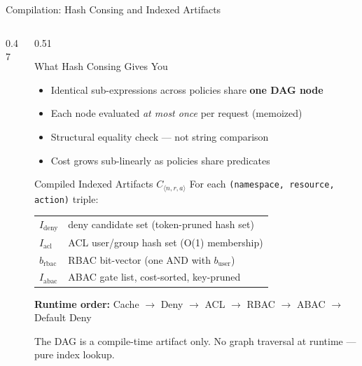 \documentclass[aspectratio=169,10pt]{beamer}
\newcommand{\tightitems}{%
  \setlength{\topsep}{1pt}%
  \setlength{\itemsep}{2pt}%
  \setlength{\parsep}{0pt}%
  \setlength{\parskip}{0pt}%
}
\newcommand{\highlightbanner}[1]{%
  \begin{center}
  \begin{tcolorbox}[colback=uhapGray,colframe=uhapGray,
                    boxrule=0pt,arc=1mm,
                    left=6pt,right=6pt,top=1pt,bottom=1pt,
                    width=0.97\linewidth,
                    borderline west={2pt}{0pt}{uhapTeal}]
  \tiny\color{uhapNavyD}#1
  \end{tcolorbox}
  \end{center}}
\begin{document}
\begin{frame}[t]{Compilation: Hash Consing and Indexed Artifacts}
\begin{columns}[T,onlytextwidth]
\begin{column}{0.47\textwidth}
{%
}
\end{column}
\begin{column}{0.51\textwidth}
\begin{callout}{What Hash Consing Gives You}
\begin{itemize}\tightitems
\item Identical sub-expressions across policies share \textbf{one DAG node}
\item Each node evaluated \emph{at most once} per request (memoized)
\item Structural equality check --- not string comparison
\item Cost grows sub-linearly as policies share predicates
\end{itemize}
\end{callout}
\vspace{0pt}
\begin{callout}{Compiled Indexed Artifacts $C_{\langle n,r,a\rangle}$}
{\tiny For each \texttt{(namespace, resource, action)} triple:}\vspace{1pt}

\setlength{\tabcolsep}{3pt}
\renewcommand{\arraystretch}{1.0}
\begin{tabular}{@{}l p{4.2cm}@{}}
$I_{\mathrm{deny}}$  & deny candidate set (token-pruned hash set) \\
$I_{\mathrm{acl}}$   & ACL user/group hash set (O(1) membership) \\
$b_{\mathrm{rbac}}$  & RBAC bit-vector (one AND with $b_{\mathrm{user}}$) \\
$I_{\mathrm{abac}}$  & ABAC gate list, cost-sorted, key-pruned \\
\end{tabular}\vspace{1pt}

\textbf{Runtime order:}
Cache $\to$ Deny $\to$ ACL $\to$ RBAC $\to$ ABAC $\to$ Default Deny
\end{callout}
\vspace{-1pt}
\highlightbanner{The DAG is a compile-time artifact only. No graph traversal at runtime --- pure index lookup.}
\end{column}
\end{columns}
\end{frame}
\end{document}
